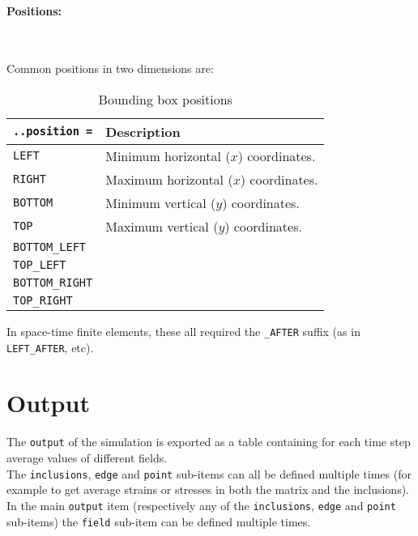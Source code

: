 \documentclass[10pt]{article}
\newcommand{\whiteline}{\textcolor{white}{.\\}}
\begin{document}
\paragraph{Positions:} \whiteline

Common positions in two dimensions are:

\begin{table}[h!]
\begin{tabularx}{\textwidth}{lX}
\verb+..position =+ & Description\\
\hline
\verb+LEFT+ & Minimum horizontal ($x$) coordinates. \\
\verb+RIGHT+ & Maximum horizontal ($x$) coordinates. \\
\verb+BOTTOM+ & Minimum vertical ($y$) coordinates. \\
\verb+TOP+ & Maximum vertical ($y$) coordinates. \\
\verb+BOTTOM_LEFT+ & \\
\verb+TOP_LEFT+ & \\
\verb+BOTTOM_RIGHT+ &  \\
\verb+TOP_RIGHT+ & \\
\hline
\end{tabularx}
\caption{Bounding box positions}
\end{table}

In space-time finite elements, these all required the \verb+_AFTER+ suffix (as in \verb+LEFT_AFTER+, etc).

\section{Output}

The \verb+output+ of the simulation is exported as a table containing for each time step average values of different fields.\\

The \verb+inclusions+, \verb+edge+ and \verb+point+ sub-items can all be defined multiple times (for example to get average strains or stresses in both the matrix and the inclusions).\\

In the main \verb+output+ item (respectively any of the \verb+inclusions+, \verb+edge+ and \verb+point+ sub-items) the \verb+field+ sub-item can be defined multiple times. 
\end{document}
